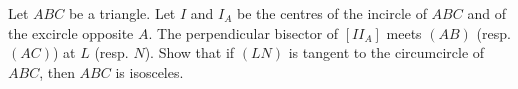 Let $ABC$ be a triangle. Let $I$ and $I_A$ be the centres of the incircle of $ABC$ and of the excircle opposite $A$. The perpendicular bisector of $[II_A]$ meets $(AB)$ (resp. $(AC)$) at $L$ (resp. $N$). Show that if $(LN)$ is tangent to the circumcircle of $ABC$, then $ABC$ is isosceles.
